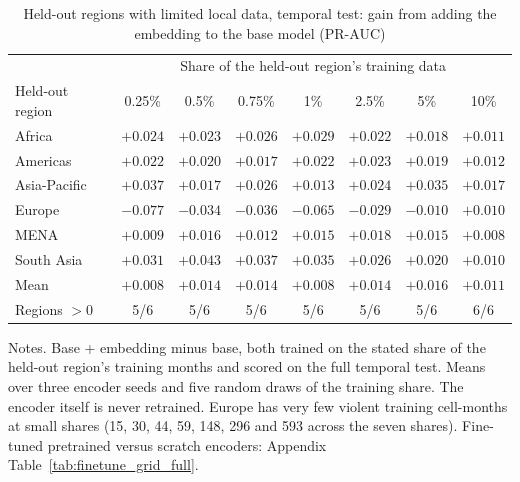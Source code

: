 \begin{table}[!htbp]
\centering\footnotesize\setlength{\tabcolsep}{4pt}
\caption{Held-out regions with limited local data, temporal test: gain from adding the embedding to the base model (PR-AUC)}
\label{tab:pretrained_1pct}
\begin{tabular}{lccccccc}
\hline
 & \multicolumn{7}{c}{Share of the held-out region's training data} \\
Held-out region & 0.25\% & 0.5\% & 0.75\% & 1\% & 2.5\% & 5\% & 10\% \\
\hline
Africa & $+0.024$ & $+0.023$ & $+0.026$ & $+0.029$ & $+0.022$ & $+0.018$ & $+0.011$ \\
Americas & $+0.022$ & $+0.020$ & $+0.017$ & $+0.022$ & $+0.023$ & $+0.019$ & $+0.012$ \\
Asia-Pacific & $+0.037$ & $+0.017$ & $+0.026$ & $+0.013$ & $+0.024$ & $+0.035$ & $+0.017$ \\
Europe & $-0.077$ & $-0.034$ & $-0.036$ & $-0.065$ & $-0.029$ & $-0.010$ & $+0.010$ \\
MENA & $+0.009$ & $+0.016$ & $+0.012$ & $+0.015$ & $+0.018$ & $+0.015$ & $+0.008$ \\
South Asia & $+0.031$ & $+0.043$ & $+0.037$ & $+0.035$ & $+0.026$ & $+0.020$ & $+0.010$ \\
\hline
Mean & $+0.008$ & $+0.014$ & $+0.014$ & $+0.008$ & $+0.014$ & $+0.016$ & $+0.011$ \\
Regions $>0$ & 5/6 & 5/6 & 5/6 & 5/6 & 5/6 & 5/6 & 6/6 \\
\hline
\end{tabular}
\begin{minipage}{0.98\textwidth}\footnotesize\vspace{0.5ex}
Notes. Base + embedding minus base, both trained on the stated share of the held-out region's training months and scored on the full temporal test.
Means over three encoder seeds and five random draws of the training share. The encoder itself is never retrained.
Europe has very few violent training cell-months at small shares (15, 30, 44, 59, 148, 296 and 593 across the seven shares).
Fine-tuned pretrained versus scratch encoders: Appendix Table~\ref{tab:finetune_grid_full}.
\end{minipage}
\end{table}

